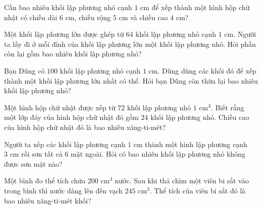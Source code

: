 \begin{ex} %
Cần bao nhiêu khối lập phương nhỏ cạnh $1\text{ cm}$ để xếp thành một hình hộp chữ nhật có chiều dài $6\text{ cm}$, chiều rộng $5\text{ cm}$ và chiều cao $4\text{ cm}$?
\end{ex}

\begin{ex} %
Một khối lập phương lớn được ghép từ $64$ khối lập phương nhỏ cạnh $1\text{ cm}$. Người ta lấy đi ở mỗi đỉnh của khối lập phương lớn một khối lập phương nhỏ. Hỏi phần còn lại gồm bao nhiêu khối lập phương nhỏ?
\end{ex}

\begin{ex} %
Bạn Dũng có $100$ khối lập phương nhỏ cạnh $1\text{ cm}$. Dũng dùng các khối đó để xếp thành một khối lập phương lớn nhất có thể. Hỏi bạn Dũng còn thừa lại bao nhiêu khối lập phương nhỏ?
\end{ex}

\begin{ex} %
Một hình hộp chữ nhật được xếp từ $72$ khối lập phương nhỏ $1\text{ cm}^3$. Biết rằng một lớp đáy của hình hộp chữ nhật đó gồm $24$ khối lập phương nhỏ. Chiều cao của hình hộp chữ nhật đó là bao nhiêu xăng-ti-mét?
\end{ex}

\begin{ex} %
Người ta xếp các khối lập phương cạnh $1\text{ cm}$ thành một hình lập phương cạnh $3\text{ cm}$ rồi sơn tất cả 6 mặt ngoài. Hỏi có bao nhiêu khối lập phương nhỏ không được sơn mặt nào?
\end{ex}

\begin{ex} %
Một bình đo thể tích chứa $200\text{ cm}^3$ nước. Sau khi thả chìm một viên bi sắt vào trong bình thì nước dâng lên đến vạch $245\text{ cm}^3$. Thể tích của viên bi sắt đó là bao nhiêu xăng-ti-mét khối?
\end{ex}
